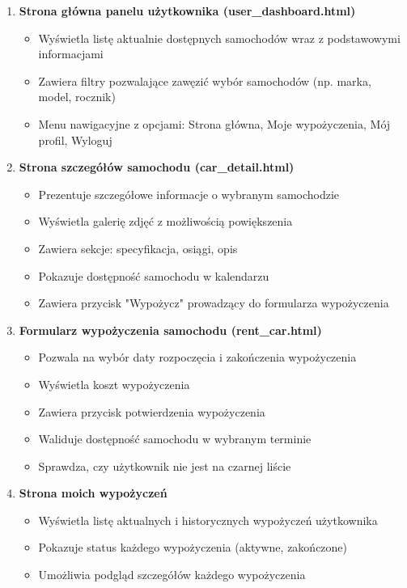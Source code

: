 \documentclass[12pt,a4paper]{article}
\begin{document}
\begin{enumerate}
    \item \textbf{Strona główna panelu użytkownika (user\_dashboard.html)}
    \begin{itemize}
        \item Wyświetla listę aktualnie dostępnych samochodów wraz z podstawowymi informacjami
        \item Zawiera filtry pozwalające zawęzić wybór samochodów (np. marka, model, rocznik)
        \item Menu nawigacyjne z opcjami: Strona główna, Moje wypożyczenia, Mój profil, Wyloguj
    \end{itemize}
    
    \item \textbf{Strona szczegółów samochodu (car\_detail.html)}
    \begin{itemize}
        \item Prezentuje szczegółowe informacje o wybranym samochodzie
        \item Wyświetla galerię zdjęć z możliwością powiększenia
        \item Zawiera sekcje: specyfikacja, osiągi, opis
        \item Pokazuje dostępność samochodu w kalendarzu
        \item Zawiera przycisk "Wypożycz" prowadzący do formularza wypożyczenia
    \end{itemize}
    
    \item \textbf{Formularz wypożyczenia samochodu (rent\_car.html)}
    \begin{itemize}
        \item Pozwala na wybór daty rozpoczęcia i zakończenia wypożyczenia
        \item Wyświetla koszt wypożyczenia
        \item Zawiera przycisk potwierdzenia wypożyczenia
        \item Waliduje dostępność samochodu w wybranym terminie
        \item Sprawdza, czy użytkownik nie jest na czarnej liście
    \end{itemize}
    
    \item \textbf{Strona moich wypożyczeń}
    \begin{itemize}
        \item Wyświetla listę aktualnych i historycznych wypożyczeń użytkownika
        \item Pokazuje status każdego wypożyczenia (aktywne, zakończone)
        \item Umożliwia podgląd szczegółów każdego wypożyczenia
    \end{itemize}
    

\end{enumerate}
\end{document}

